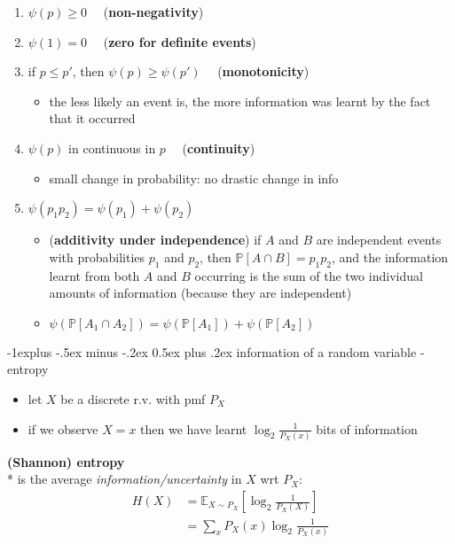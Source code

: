 \documentclass[10pt, landscape]{article}
\makeatletter
\renewcommand{\subsection}{\@startsection{subsection}{2}{0mm}%
  {-1explus -.5ex minus -.2ex}%
  {0.5ex plus .2ex}%
{\normalfont\normalsize\bfseries}}
\makeatother
\begin{document}
\begin{multicols*}{4}
  \begin{enumerate}
    \item $\psi(p) \geq 0\quad$ (\textbf{non-negativity}) 
    \item $\psi(1) = 0\quad$ (\textbf{zero for definite events}) 
    \item if $p \leq p'$, then $\psi(p) \geq \psi(p') \quad$ (\textbf{monotonicity})
      \begin{itemize}
        \item the less likely an event is, the more information was learnt by the fact that it occurred
      \end{itemize}
    \item $\psi(p)$ in continuous in $p \quad$ (\textbf{continuity}) 
      \begin{itemize}
        \item small change in probability: no drastic change in info
      \end{itemize}
    \item $\psi(p_1 p_2) = \psi(p_1) + \psi(p_2)\quad$  
      \begin{itemize}
        \item (\textbf{additivity under independence}) if $A$ and $B$ are independent events with probabilities $p_1$ and $p_2$, then $\mathbb{P}[A \cap B]=p_1p_2$, and the information learnt from both $A$ and $B$ occurring is the sum of the two individual amounts of information (because they are independent)
        \item $\psi(\mathbb{P}[A_1 \cap A_2]) = \psi(\mathbb{P}[A_1]) + \psi(\mathbb{P}[A_2])$
      \end{itemize}
  \end{enumerate}


  \subsection{information of a random variable - entropy}

  \begin{itemize}
    \item let $X$ be a discrete r.v. with pmf $P_X$
    \item if we observe $X=x$ then we have learnt $\log_2 \frac{1}{P_X(x)}$ bits of information
  \end{itemize}

  \begin{tightcenter}
    \textbf{(Shannon) entropy} \\* is the average \textit{information/uncertainty} in $X$ wrt $P_X$:
    \begin{align*}
      H(X) &= \mathbb{E }_{X \sim P_X} \left[ \log_2 \frac{1}{P_X(X)} \right] 
        \\ &= \sum_x P_X(x) \log_2 \frac{1}{P_X(x)}
    \end{align*}
  \end{tightcenter}


\end{multicols*}
\end{document}
